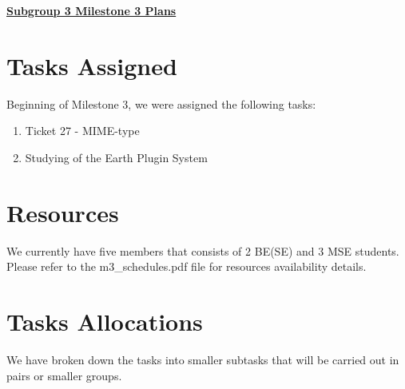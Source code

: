 \documentclass{article}
\begin{document}
{\large \textbf{\underline{Subgroup 3 Milestone 3 Plans}}}

\section{Tasks Assigned}

Beginning of Milestone 3, we were assigned the following tasks:

\begin{enumerate}
	\item Ticket 27 - MIME-type
	\item Studying of the Earth Plugin System
\end{enumerate} 

\section{Resources}

We currently have five members that consists of 2 BE(SE) and 3 MSE students. Please refer to the m3\_schedules.pdf file for resources availability details. 

\section{Tasks Allocations}

We have broken down the tasks into smaller subtasks that will be carried out in pairs or smaller groups. 
\end{document}
